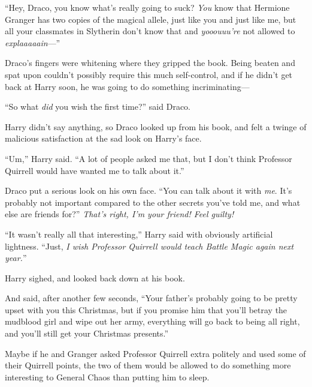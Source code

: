 “Hey, Draco, you know what’s really going to suck? \emph{You} know that Hermione Granger has two copies of the magical allele, just like you and just like me, but all your classmates in Slytherin don’t know that and \emph{yooouuu’re} not allowed to \emph{explaaaaain}—”

Draco’s fingers were whitening where they gripped the book. Being beaten and spat upon couldn’t possibly require this much self-control, and if he didn’t get back at Harry soon, he was going to do something incriminating—

“So what \emph{did} you wish the first time?” said Draco.

Harry didn’t say anything, so Draco looked up from his book, and felt a twinge of malicious satisfaction at the sad look on Harry’s face.

“Um,” Harry said. “A lot of people asked me that, but I don’t think Professor Quirrell would have wanted me to talk about it.”

Draco put a serious look on his own face. “You can talk about it with \emph{me}. It’s probably not important compared to the other secrets you’ve told me, and what else are friends for?” \emph{That’s right, I’m your friend! Feel guilty!}

“It wasn’t really all that interesting,” Harry said with obviously artificial lightness. “Just, \emph{I wish Professor Quirrell would teach Battle Magic again next year.}”

Harry sighed, and looked back down at his book.

And said, after another few seconds, “Your father’s probably going to be pretty upset with you this Christmas, but if you promise him that you’ll betray the mudblood girl and wipe out her army, everything will go back to being all right, and you’ll still get your Christmas presents.”

Maybe if he and Granger asked Professor Quirrell extra politely and used some of their Quirrell points, the two of them would be allowed to do something more interesting to General Chaos than putting him to sleep.

